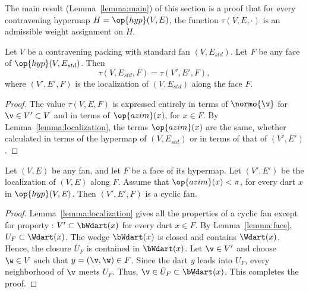 The main result (Lemma~\ref{lemma:main}) of this section is a proof
that for every contravening hypermap $H=\op{hyp}(V,E)$, the function
$\tau(V,E,\cdot)$ is an admissible weight assignment on $H$.



\begin{lemma}  \label{lemma:tau-local}
  Let $V$ be a contravening packing with standard fan $(V,E_{std})$.
  Let $F$ be any face of $\op{hyp}(V,E_{std})$.  Then
\begin{displaymath}
\tau(V,E_{std},F) = \tau(V',E',F),
\end{displaymath}
where $(V',E',F)$ is the localization of $(V,E_{std})$ along the face $F$.
\end{lemma}

\begin{proof} The value $\tau(V,E,F)$ is expressed entirely in terms
  of $\normo{\v}$ for $\v\in V'\subset V$ and in terms of
  $\op{azim}(x)$, for $x\in F$.  By Lemma~\ref{lemma:localization},
  the terms $\op{azim}(x)$ are the same, whether calculated in terms
  of the hypermap of $(V,E_{std})$ or in terms of that of $(V',E')$.
\end{proof}


\begin{lemma}  Let $(V,E)$ be any fan, and
  let $F$ be a face of its hypermap.  Let $(V',E')$ be the
  localization of $(V,E)$ along $F$.  Assume that $\op{azim}(x)<\pi$,
  for every dart $x$ in $\op{hyp}(V,E)$.  Then $(V',E',F)$ is a cyclic
  fan.
\end{lemma}

\begin{proof}
  Lemma~\ref{lemma:localization} gives all the properties of a cyclic
  fan except for property : $V'\subset \bWdart(x)$ for
  every dart $x\in F$.  By Lemma~\ref{lemma:face}, $U_F \subset
  \Wdart(x)$.  The wedge $\bWdart(x)$ is closed and contains
  $\Wdart(x)$. Hence, the closure $\bar U_F$ is contained in
  $\bWdart(x)$.  Let $\v\in V'$ and choose $\w\in V$ such that
  $y=(\v,\w)\in F$.
  Since the dart $y$ leads into $U_F$, every neighborhood of $\v$
  meets $U_F$.  Thus, $\v\in \bar U_F\subset \bWdart(x)$.  This
  completes the proof.
\end{proof}








